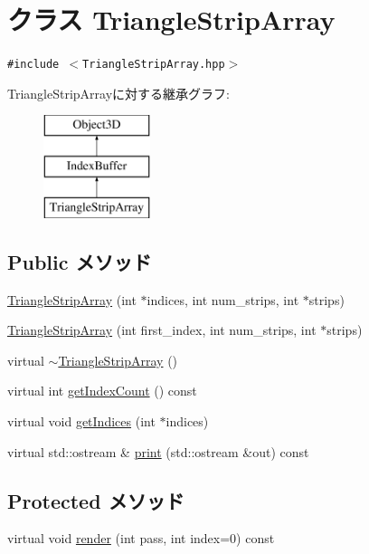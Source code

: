 \hypertarget{classm3g_1_1TriangleStripArray}{
\section{クラス TriangleStripArray}
\label{classm3g_1_1TriangleStripArray}
}
{\tt \#include $<$TriangleStripArray.hpp$>$}

TriangleStripArrayに対する継承グラフ:\begin{figure}[H]
\begin{center}
\leavevmode
\includegraphics[height=3cm]{classm3g_1_1TriangleStripArray}
\end{center}
\end{figure}
\subsection*{Public メソッド}
\begin{CompactItemize}
\item 
\hyperlink{classm3g_1_1TriangleStripArray_57d4e874819367084aeadb11593c4436}{TriangleStripArray} (int $\ast$indices, int num\_\-strips, int $\ast$strips)
\item 
\hyperlink{classm3g_1_1TriangleStripArray_d2ca9884a6ccf32da3cee977549b5ee0}{TriangleStripArray} (int first\_\-index, int num\_\-strips, int $\ast$strips)
\item 
virtual \hyperlink{classm3g_1_1TriangleStripArray_1cb3853bf79b7710d57044da818d2cde}{$\sim$TriangleStripArray} ()
\item 
virtual int \hyperlink{classm3g_1_1TriangleStripArray_fe9ae2993ebcdb93d5ff26d57c81b73e}{getIndexCount} () const 
\item 
virtual void \hyperlink{classm3g_1_1TriangleStripArray_650953afac45099025a524ab160b911f}{getIndices} (int $\ast$indices)
\item 
virtual std::ostream \& \hyperlink{classm3g_1_1TriangleStripArray_6fea17fa1532df3794f8cb39cb4f911f}{print} (std::ostream \&out) const 
\end{CompactItemize}
\subsection*{Protected メソッド}
\begin{CompactItemize}
\item 
virtual void \hyperlink{classm3g_1_1TriangleStripArray_1efcb1973989d9963d5bd6d03065d389}{render} (int pass, int index=0) const 
\end{CompactItemize}
